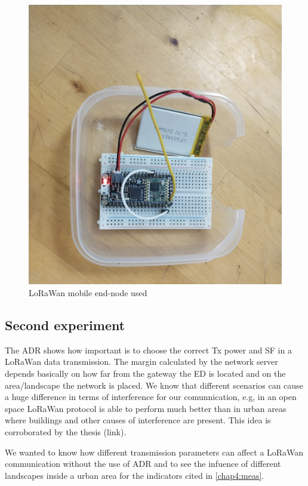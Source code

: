 \begin{figure}[htbp]
    \includegraphics[width=\linewidth]{EndNode0.jpeg}
    \caption{LoRaWan mobile end-node used}
    \label{chap4:endNode0}
\end{figure}

\subsection{Second experiment}
\label{chap4:exp2}

The ADR shows how important is to choose the correct Tx power and SF in a LoRaWan data transmission. The margin 
calculated by the network server depends basically on how far from the gateway the ED is located and on the 
area/landscape the network is placed. We know that different scenarios can cause a huge difference in terms 
of interference for our comunnication, e.g, in an open space LoRaWan protocol is able to perform much better 
than in urban areas where buildings and other causes of interference are present. This idea is corroborated 
by the thesis (link).

We wanted to know how different transmission parameters can affect a LoRaWan communication without the use of ADR
and to see the infuence of different landscapes inside a urban area for the indicators cited in \ref{chap4:meas}.


